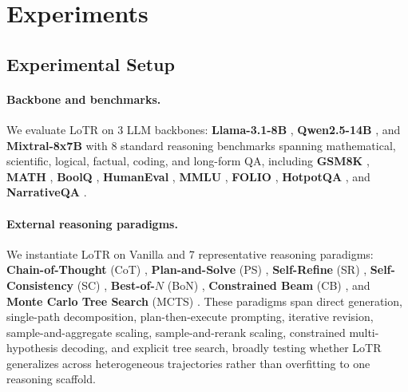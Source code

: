 \vspace{-1mm}
\section{Experiments}
\label{sec:exp}

\vspace{-1mm}
\subsection{Experimental Setup}
\label{sec:setup}
\vspace{-1mm}

\paragraph{Backbone and benchmarks.}
We evaluate LoTR on 3 LLM backbones: \textbf{Llama-3.1-8B} \citep{grattafiori2024llama3}, \textbf{Qwen2.5-14B} \citep{yang2024qwen25}, and \textbf{Mixtral-8x7B} \citep{jiang2024mixtral} with 8 standard reasoning benchmarks spanning mathematical, scientific, logical, factual, coding, and long-form QA, including \textbf{GSM8K} \citep{cobbe2021gsm8k}, \textbf{MATH} \citep{hendrycks2021math}, \textbf{BoolQ} \citep{clark2019boolq}, \textbf{HumanEval} \citep{chen2021evaluating}, \textbf{MMLU} \citep{hendrycks2021mathmassive}, \textbf{FOLIO} \citep{han2022folio}, \textbf{HotpotQA} \citep{yang2018hotpotqa}, and \textbf{NarrativeQA} \citep{kocisky2018narrativeqa}. 

\vspace{-1mm}
\paragraph{External reasoning paradigms.}
We instantiate LoTR on Vanilla and 7 representative reasoning paradigms: 
\textbf{Chain-of-Thought} (CoT) \citep{wei2022chain}, 
\textbf{Plan-and-Solve} (PS) \citep{wang2023plan}, 
\textbf{Self-Refine} (SR) \citep{madaan2023selfrefine}, 
\textbf{Self-Consistency} (SC) \citep{wang2023selfconsistency}, 
\textbf{Best-of-$N$} (BoN) \citep{chow2024inferenceaware,lightman2024verify}, 
\textbf{Constrained Beam} (CB) \citep{hokamp2017lexically,post2018fast}, and 
\textbf{Monte Carlo Tree Search} (MCTS) \citep{xie2024mcts}. 
These paradigms span direct generation, single-path decomposition, plan-then-execute prompting, iterative revision, sample-and-aggregate scaling, sample-and-rerank scaling, constrained multi-hypothesis decoding, and explicit tree search, broadly testing whether LoTR generalizes across heterogeneous trajectories rather than overfitting to one reasoning scaffold.

